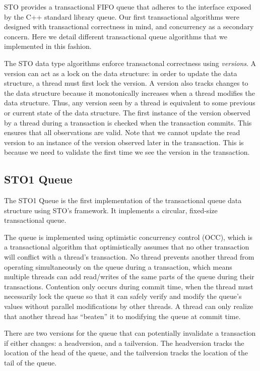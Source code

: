 STO provides a transactional FIFO queue that adheres to the interface exposed by the C++ standard library queue. Our first transactional algorithms were designed with transactional correctness in mind, and concurrency as a secondary concern. Here we detail different transactional queue algorithms that we implemented in this fashion.

The STO data type algorithms enforce transactonal correctness using \emph{versions}. A version can act as a lock on the data structure: in order to update the data structure, a thread must first lock the version. A version also tracks changes to the data structure because it monotonically increases when a thread modifies the data structure. Thus, any version seen by a thread is equivalent to some previous or current state of the data structure. The first instance of the version observed by a thread during a transaction is checked when the transaction commits. This ensures that all observations are valid. Note that we cannot update the read version to an instance of the version observed later in the transaction. This is because we need to validate the first time we see the version in the transaction. 

\subsection{STO1 Queue}
%
The STO1 Queue is the first implementation of the transactional queue data structure using STO's framework. It implements a circular, fixed-size transactional queue.

The queue is implemented using optimistic concurrency control (OCC), which is a transactional algorithm that optimistically assumes that no other transaction will conflict with a thread's transaction. No thread prevents another thread from operating simultaneously on the queue during a transaction, which means multiple threads can add read/writes of the same parts of the queue during their transactions. Contention only occurs during commit time, when the thread must necessarily lock the queue so that it can safely verify and modify the queue's values without parallel modifications by other threads. A thread can only realize that another thread has “beaten” it to modifying the queue at commit time.

There are two versions for the queue that can potentially invalidate a transaction if either changes: a headversion, and a tailversion. The headversion tracks the location of the head of the queue, and the tailversion tracks the location of the tail of the queue.

